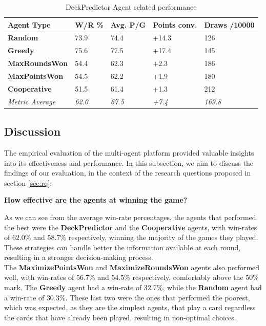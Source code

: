\documentclass[sigconf]{acmart}
\begin{document}
\begin{table}[H]
  \fontsize{11}{13}\selectfont %
  \begin{tabular}{@{}p{2.9cm}p{1cm}p{1cm}p{1.2cm}p{1.2cm}@{}}
    \toprule
    Agent Type & \textbf{W/R \%} & \textbf{Avg. P/G} & \textbf{Points conv.} & \textbf{Draws /10000}\\
    \midrule
    \textbf{Random} & 73.9 & 74.4 & +14.3 & 126\\
    \textbf{Greedy} & 75.6 & 77.5 & +17.4 & 145\\
    \textbf{MaxRoundsWon} & 54.4 & 62.3 & +2.3 & 186\\
    \textbf{MaxPointsWon} & 54.5 & 62.2 & +1.9 & 180\\
    \textbf{Cooperative} & 51.5 & 61.4 & +1.3 & 212\\
    \midrule
    \textit{Metric Average} & \textit{62.0} & \textit{67.5} & \textit{+7.4} & \textit{169.8}\\
    \bottomrule
  \end{tabular}
  \vspace{2mm} %
  \caption{DeckPredictor Agent related performance}
  \label{tab:predictor}
\end{table}

\vspace{-10mm} %

\subsection{Discussion}

The empirical evaluation of the multi-agent platform provided valuable insights into its effectiveness and performance. In this subsection, we aim to discuss the findings of our evaluation, in the context of the research questions proposed in section \ref{sec:rq}:

{\centering\fontsize{9}{24}\selectfont\textbf{How effective are the agents at winning the game?}\par}
\vspace{2mm} %

\noindent As we can see from the average win-rate percentages, the agents that performed the best were the \textbf{DeckPredictor} and the \textbf{Cooperative} agents, with win-rates of $62.0\%$ and $58.7\%$ respectively, winning the majority of the games they played. These strategies can handle better the information available at each round, resulting in a stronger decision-making process.\\
\noindent The \textbf{MaximizePointsWon} and \textbf{MaximizeRoundsWon} agents also performed well, with win-rates of $56.7\%$ and $54.5\%$ respectively, comfortably above the $50\%$ mark. The \textbf{Greedy} agent had a win-rate of $32.7\%$, while the \textbf{Random} agent had a win-rate of $30.3\%$. These last two were the ones that performed the poorest, which was expected, as they are the simplest agents, that play a card regardless the cards that have already been played, resulting in non-optimal choices.\\
\end{document}
